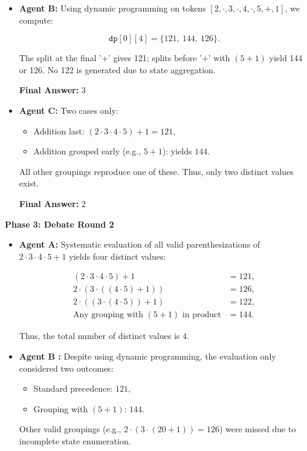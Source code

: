\begin{tcolorbox}
\begin{itemize}[leftmargin=1.5em, nosep]
Thus, the number of distinct values is $\boxed{4}$.
        \item \textbf{Agent B:} Using dynamic programming on tokens $[2,\cdot,3,\cdot,4,\cdot,5,+,1]$, we compute:

\[
\texttt{dp}[0][4] = \{121,\ 144,\ 126\}.
\]

The split at the final '+' gives 121; splits before '+' with $(5+1)$ yield 144 or 126.
No 122 is generated due to state aggregation.

\medskip
\noindent\textbf{Final Answer:} $\boxed{3}$
        \item \textbf{Agent C:} Two cases only:
\begin{itemize}[left=0pt,topsep=2pt,itemsep=0pt]
    \item Addition last: $(2\cdot3\cdot4\cdot5)+1 = 121$,
    \item Addition grouped early (e.g., $5+1$): yields $144$.
\end{itemize}

All other groupings reproduce one of these. Thus, only two distinct values exist.

\medskip
\noindent\textbf{Final Answer:} $\boxed{2}$
    \end{itemize}

    \vspace{0.1cm}
    \textbf{Phase 3: Debate Round 2 }
    \begin{itemize}[leftmargin=1.5em, nosep]
        \item \textbf{Agent A:} Systematic evaluation of all valid parenthesizations of $2 \cdot 3 \cdot 4 \cdot 5 + 1$ yields four distinct values:

\begin{align*}
(2\cdot3\cdot4\cdot5) + 1 &= 121, \\
2 \cdot (3 \cdot ((4 \cdot 5) + 1)) &= 126, \\
2 \cdot ((3 \cdot (4 \cdot 5)) + 1) &= 122, \\
\text{Any grouping with } (5+1) \text{ in product} &= 144.
\end{align*}

Thus, the total number of distinct values is $\boxed{4}$.
        \item \textbf{Agent B :} Despite using dynamic programming, the evaluation only considered two outcomes:
\begin{itemize}[left=0pt,topsep=2pt,itemsep=0pt]
    \item Standard precedence: $121$,
    \item Grouping with $(5+1)$: $144$.
\end{itemize}
Other valid groupings (e.g., $2 \cdot (3 \cdot (20 + 1)) = 126$) were missed due to incomplete state enumeration.


\end{itemize}
\end{tcolorbox}
